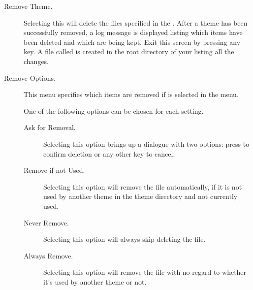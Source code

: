 \begin{description}
  \item[Remove Theme.]
  Selecting this will delete the files specified in the .
  After a theme has been successfully removed, a log message is displayed listing 
  which items have been deleted and which are being kept. Exit this screen by 
  pressing any key. A file called  is created in 
  the root directory of your \dap{} listing all the changes.

  \item[Remove Options.]
  This menu specifies which items are removed if
   is selected in the menu.

  One of the following options can be chosen for each setting.
  \begin{description}
    \item[Ask for Removal.]
    Selecting this option brings up a dialogue with two options:
    press \ActionYesNoAccept{} to confirm deletion or any other key to cancel.
    \item[Remove if not Used.]
    Selecting this option will remove the file automatically, if it is not 
    used by another theme in the theme directory and not currently used.
    \item[Never Remove.]
    Selecting this option will always skip deleting the file.
    \item[Always Remove.]
    Selecting this option will remove the file with no regard to
    whether it's used by another theme or not.
  \end{description}


\end{description}
